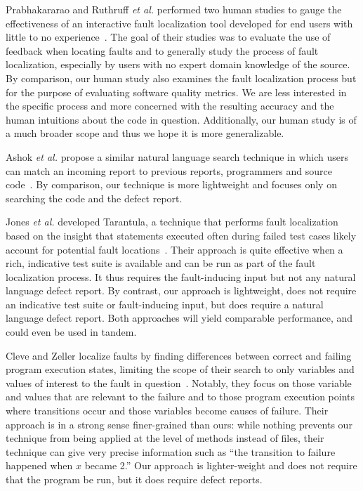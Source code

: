 \documentclass[conference]{IEEEtran}
\begin{document}
Prabhakararao and Ruthruff \emph{et al.} performed two human studies
to gauge the effectiveness of an interactive fault localization tool
developed for end users with little to no
experience~\cite{Prabhakararao03,ruthruff05}.  The goal of their
studies was to evaluate the use of feedback when locating faults and
to generally study the process of fault localization, especially by
users with no expert domain knowledge of the source.  By comparison,
our human study also examines the fault localization process but for
the purpose of evaluating software quality metrics.  We are less
interested in the specific process and more concerned with the
resulting accuracy and the human intuitions about the code in
question.  Additionally, our human study is of a much broader scope and
thus we hope it is more generalizable.


Ashok \textit{et al.} propose a similar natural language search technique
in which users can match an incoming report to previous reports,
programmers and source code~\cite{Ashok09}.  By comparison, our technique
is more lightweight and focuses only on searching the code and the
defect report.

Jones \textit{et al.} developed Tarantula, a technique that performs
fault localization based on the insight that statements executed often
during failed test cases likely account for potential fault
locations~\cite{harrold05}. Their approach is quite effective when
a rich, indicative test suite is available and can be run as part of
the fault localization process. It thus requires the fault-inducing
input but not any natural language defect report. By contrast,
our approach is lightweight, does not require an indicative test
suite or fault-inducing input, but does require a natural language
defect report. Both approaches will yield comparable performance, and
could even be used in tandem.

Cleve and Zeller localize faults by finding differences between
correct and failing program execution states, limiting the scope of
their search to only variables and values of interest to the fault in
question~\cite{cleve05}. Notably, they focus on those variable and
values that are relevant to the failure and to those program execution
points where transitions occur and those variables become causes of
failure. Their approach is in a strong sense finer-grained than ours:
while nothing prevents our technique from being applied at the level
of methods instead of files, their technique can give very precise
information such as ``the transition to failure happened when $x$
became 2.'' Our approach is lighter-weight and does not require
that the program be run, but it does require defect reports.
\end{document}
